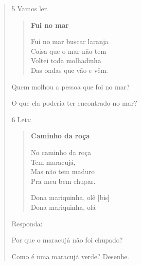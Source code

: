 \begin{verse}
\begin{escolha}
\end{escolha}

\num{5} Vamos ler.

\begin{verse}
\textbf{Fui no mar}

Fui no mar buscar laranja\\
Coisa que o mar não tem\\
Voltei toda molhadinha\\
Das ondas que vão e vêm.
\end{verse}


\begin{escolha}
\item Quem molhou a pessoa que foi no mar?


\item O que ela poderia ter encontrado no mar?

\end{escolha}

\num{6} Leia:


\begin{verse}
\textbf{Caminho da roça}

No caminho da roça\\
Tem maracujá,\\
Mas não tem maduro\\
Pra meu bem chupar.

Dona mariquinha, olê {[}bis{]}\\
Dona mariquinha, olá
\end{verse}


Responda:

\begin{escolha}
\item Por que o maracujá não foi chupado?


\item Como é uma maracujá verde? Desenhe.


\end{escolha}
\end{verse}
